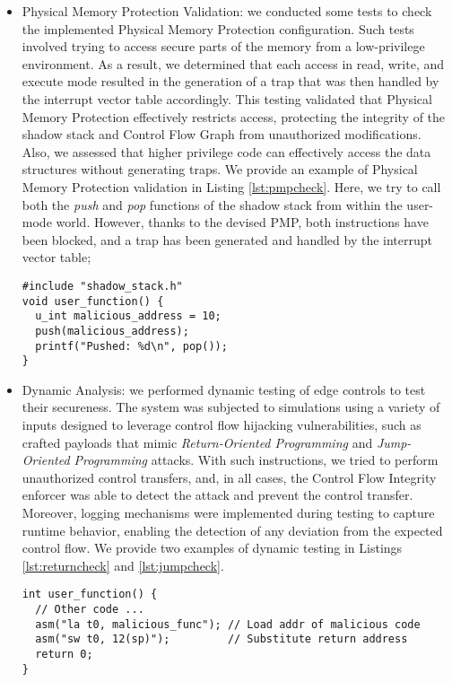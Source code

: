 \begin{itemize}
  \item Physical Memory Protection Validation: we conducted some tests to check
    the implemented Physical Memory Protection configuration. Such tests involved
    trying to access secure parts of the memory from a low-privilege environment.
    As a result, we determined that each access in read, write, and execute mode
    resulted in the generation of a trap that was then handled by the interrupt vector
    table accordingly. This testing validated that Physical Memory Protection
    effectively restricts access, protecting the integrity of the shadow stack and
    Control Flow Graph from unauthorized modifications. Also, we assessed that higher
    privilege code can effectively access the data structures without generating
    traps. We provide an example of Physical Memory Protection validation in
    Listing \ref{lst:pmpcheck}. Here, we try to call both the \textit{push} and \textit{pop}
    functions of the shadow stack from within the user-mode world. However,
    thanks to the devised PMP, both instructions have been blocked, and a trap
    has been generated and handled by the interrupt vector table;

    \begin{lstlisting}[style=CStyle, caption = Physical Memory Protection testing, label={lst:pmpcheck}]
#include "shadow_stack.h"
void user_function() {
  u_int malicious_address = 10;
  push(malicious_address);
  printf("Pushed: %d\n", pop());
}
 \end{lstlisting}

  \item Dynamic Analysis: we performed dynamic testing of edge controls to test
    their secureness. The system was subjected to simulations using a variety of
    inputs designed to leverage control flow hijacking vulnerabilities, such as
    crafted payloads that mimic \textit{Return-Oriented Programming} and \textit{Jump-Oriented
    Programming} attacks. With such instructions, we tried to perform
    unauthorized control transfers, and, in all cases, the Control Flow Integrity
    enforcer was able to detect the attack and prevent the control transfer.
    Moreover, logging mechanisms were implemented during testing to capture runtime
    behavior, enabling the detection of any deviation from the expected control
    flow. We provide two examples of dynamic testing in Listings \ref{lst:returncheck}
    and \ref{lst:jumpcheck}.

    \begin{lstlisting}[style=CStyle, caption = \textit{Return-Oriented Programming} simulation attack, label={lst:returncheck}]
int user_function() {
  // Other code ...
  asm("la t0, malicious_func"); // Load addr of malicious code
  asm("sw t0, 12(sp)");         // Substitute return address
  return 0;
}
 \end{lstlisting}


\end{itemize}
